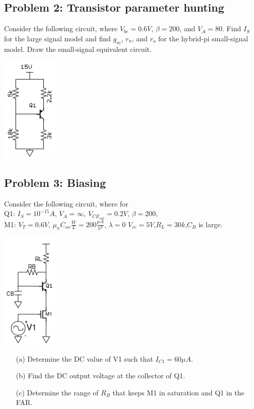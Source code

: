 \documentclass[11pt,twoside]{article}
\begin{document}
\subsection*{Problem 2: Transistor parameter hunting}
Consider the following circuit, where $V_{be}=0.6V$, $\beta=200$, and $V_A=80$.
Find $I_S$ for the large signal model and find $g_m$, $r_\pi$, and $r_o$ for the hybrid-pi small-signal model.
Draw the small-signal equivalent circuit.		

\begin{center}
\includegraphics[width=0.2\textwidth]{params.png}
\end{center}

\subsection*{Problem 3: Biasing}
Consider the following circuit, where for\\
Q1: $I_S=10^{-15}A$, $V_A=\infty$, $V_{CE_{sat}}=0.2V$, $\beta=200$,\\
M1: $V_T = 0.6V$, $\mu_nC_{ox}\frac{W}{L}=200\frac{\mu A}{V^2}$, $\lambda=0$
$V_{cc}=5V$,$R_L=30k$,$C_B$ is large. 

\begin{center}
\includegraphics[width=0.2\textwidth]{biasing.png}
\end{center}

\begin{enumerate}
\item[(a)] Determine the DC value of V1 such that $I_{C1}=60\mu A$.
\item[(b)] Find the DC output voltage at the collector of Q1.
\item[(c)] Determine the range of $R_B$ that keeps M1 in saturation and Q1 in the FAR.
\end{enumerate}
\end{document}
